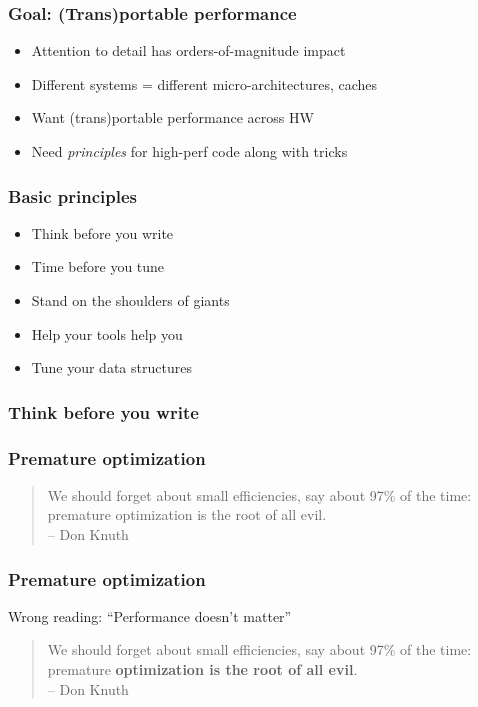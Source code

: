 \documentclass{beamer}
\begin{document}
\begin{frame}
  \frametitle{Goal: (Trans)portable performance}

  \begin{itemize}
  \item Attention to detail has orders-of-magnitude impact
  \item Different systems = different micro-architectures, caches
  \item Want (trans)portable performance across HW
  \item Need {\em principles} for high-perf code along with
    tricks
  \end{itemize}
\end{frame}


\begin{frame}
  \frametitle{Basic principles}

  \begin{itemize}
  \item Think before you write
  \item Time before you tune
  \item Stand on the shoulders of giants
  \item Help your tools help you
  \item Tune your data structures
  \end{itemize}
  
\end{frame}




\begin{frame}
  \frametitle{Think before you write}
\end{frame}


\begin{frame}
  \frametitle{Premature optimization}

  \begin{quote}
  We should forget about small efficiencies, say about 97\% of the
  time: premature optimization is the root of all evil. \\
  \hfill -- Don Knuth
  \end{quote}
\end{frame}


\begin{frame}
  \frametitle{Premature optimization}

  Wrong reading: ``Performance doesn't matter''
  \begin{quote}
  We should forget about small efficiencies, say about 97\% of the
  time: premature {\bf optimization is the root of all evil}. \\
  \hfill -- Don Knuth
  \end{quote}
\end{frame}
\end{document}
